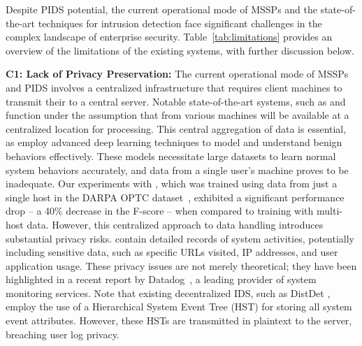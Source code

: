 Despite PIDS potential, the current operational mode of MSSPs and the state-of-the-art techniques for intrusion detection face significant challenges in the complex landscape of enterprise security. Table~\ref{tab:limitations} provides an overview of the limitations of the existing systems, with further discussion below.









\smallskip
\noindent
\textbf{C1: Lack of Privacy Preservation:} The current operational mode of MSSPs and PIDS involves a centralized infrastructure that requires client machines to transmit their \logs to a central server. Notable state-of-the-art systems, such as \flash\cite{flash2024} and \kairos~\cite{cheng2023kairos} function under the assumption that \logs from various machines will be available at a centralized location for processing. This central aggregation of data is essential, as \pids employ advanced deep learning techniques to model and understand benign behaviors effectively. These models necessitate large datasets to learn normal system behaviors accurately, and data from a single user's machine proves to be inadequate. Our experiments with \flash, which was trained using data from just a single host in the DARPA OPTC dataset~\cite{darpaoptc}, exhibited a significant performance drop -- a 40\% decrease in the F-score -- when compared to training with multi-host data. However, this centralized approach to data handling introduces substantial privacy risks. \logs contain detailed records of system activities, potentially including sensitive data, such as specific URLs visited, IP addresses, and user application usage. These privacy issues are not merely theoretical; they have been highlighted in a recent report by Datadog~\cite{datadog}, a leading provider of system monitoring services. Note that existing decentralized IDS, such as DistDet \cite{dong2023distdet}, employ the use of a Hierarchical System Event Tree (HST) for storing all system event attributes. However, these HSTs are transmitted in plaintext to the server, breaching user log privacy.

